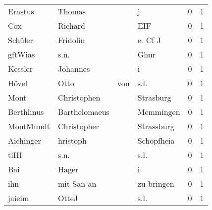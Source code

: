 \begin{center}
\begin{tiny}
\begin{longtabu}{llllrr}
                  Erastus &                             Thomas &             &                                           j &          0 &         1 \\
                      Cox &                            Richard &             &                                         EIF &          0 &         1 \\
                  Schüler &                           Fridolin &             &                                     e. Cf J &          0 &         1 \\
                  gftWias &                               s.n. &             &                                        Ghur &          0 &         1 \\
                  Kessler &                           Johannes &             &                                           i &          0 &         1 \\
                    Hövel &                               Otto &         von &                                        s.l. &          0 &         1 \\
                     Mont &                        Christophen &             &                                   Strasburg &          0 &         1 \\
               Berthlinus &                      Barthelomaeus &             &                                   Memmingen &          0 &         1 \\
                MontMundt &                        Christopher &             &                                  Strassburg &          0 &         1 \\
                Aichinger &                           hristoph &             &                                  Schopfheia &          0 &         1 \\
                    tiIII &                               s.n. &             &                                        s.l. &          0 &         1 \\
                      Bai &                              Hager &             &                                           i &          0 &         1 \\
                      ihn &                         mit San an &             &                                  zu bringen &          0 &         1 \\
                   jaieim &                              OtteJ &             &                                        s.l. &          0 &         1 \\

\end{longtabu}
\end{tiny}
\end{center}
